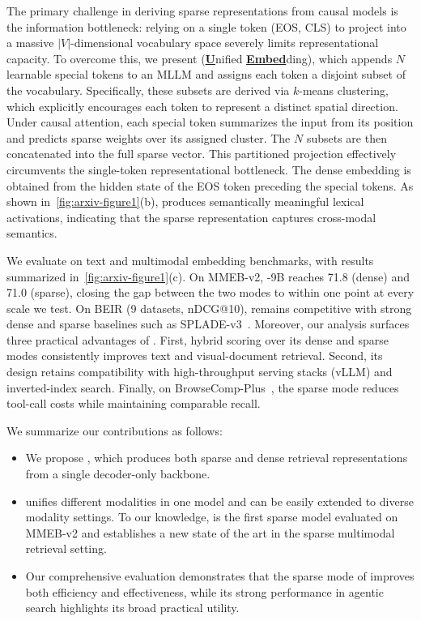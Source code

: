 The primary challenge in deriving sparse representations from causal models is the information bottleneck: relying on a single token (\eg EOS, CLS) to project into a massive $|V|$-dimensional vocabulary space severely limits representational capacity. To overcome this, we present \ours (\textbf{\underline{U}}nified \textbf{\underline{Embed}}ding), which appends $N$ learnable special tokens to an MLLM and assigns each token a disjoint subset of the vocabulary. Specifically, these subsets are derived via $k$-means clustering, which explicitly encourages each token to represent a distinct spatial direction. Under causal attention, each special token summarizes the input from its position and predicts sparse weights over its assigned cluster. The $N$ subsets are then concatenated into the full sparse vector. This partitioned projection effectively circumvents the single-token representational bottleneck. The dense embedding is obtained from the hidden state of the EOS token preceding the special tokens.    
As shown in~\autoref{fig:arxiv-figure1}(b), \ours produces semantically meaningful lexical activations, indicating that the sparse representation captures cross-modal semantics.

We evaluate \ours on text and multimodal embedding benchmarks, with results summarized in~\autoref{fig:arxiv-figure1}(c).
On MMEB-v2, \ours-9B reaches 71.8 (dense) and 71.0 (sparse), closing the gap between the two modes to within one point at every scale we test.
On BEIR (9 datasets, nDCG@10), \ours remains competitive with strong dense and sparse baselines such as SPLADE-v3~\citep{spladev3}.
Moreover, our analysis surfaces three practical advantages of \ours. First, hybrid scoring over its dense and sparse modes consistently improves text and visual-document retrieval. Second, its design retains compatibility with high-throughput serving stacks (\eg vLLM) and inverted-index search. Finally, on BrowseComp-Plus~\citep{browsecompplus}, the sparse mode reduces tool-call costs while maintaining comparable recall. 

We summarize our contributions as follows:
\begin{itemize} [leftmargin=*]
\itemsep0em
    \item We propose \ours, which produces both sparse and dense retrieval representations from a single decoder-only backbone. 
    \item \ours unifies different modalities in one model and can be easily extended to diverse modality settings. To our knowledge, \ours is the first sparse model evaluated on MMEB-v2 and establishes a new state of the art in the sparse multimodal retrieval setting. 
    \item Our comprehensive evaluation demonstrates that the sparse mode of \ours improves both efficiency and effectiveness, while its strong performance in agentic search highlights its broad practical utility.
\end{itemize}
